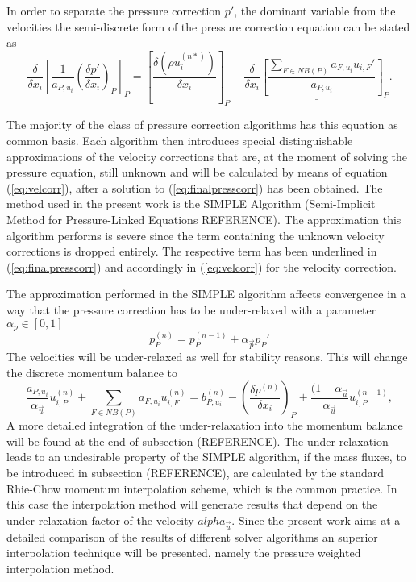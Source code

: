   In order to separate the pressure correction \(p'\), the dominant variable from the velocities the semi-discrete form of the pressure correction equation can be stated as
  \begin{equation}
    \label{eq:finalpresscorr}
   \frac{\delta}{\delta x_i} \left[\frac{1}{a_{P,u_i}}\left(\frac{\delta p'}{\delta x_i}\right)_P\right]_{P}
  =
    \left[\frac{\delta \left(\rho u_i^{(n*)}\right)}{\delta x_i} \right]_{P}
    - \underline{\frac{\delta}{\delta x_i} \left[ \frac{\sum_{F \in NB(P)} a_{F,u_i} u_{i,F}'}{a_{P,u_i}}\right]_{P}}.
  \end{equation}
  
  The majority of the class of pressure correction algorithms has this equation as common basis. Each algorithm then introduces special distinguishable approximations of the velocity corrections that are, at the moment of solving the pressure equation, still unknown and will be calculated by means of equation (\ref{eq:velcorr}), after a solution to (\ref{eq:finalpresscorr}) has been obtained. The method used in the present work is the SIMPLE Algorithm (Semi-Implicit Method for Pressure-Linked Equations REFERENCE). The approximation this algorithm performs is severe since the term containing the unknown velocity corrections is dropped entirely. The respective term has been underlined in (\ref{eq:finalpresscorr}) and accordingly in (\ref{eq:velcorr}) for the velocity correction.
  
  The approximation performed in the SIMPLE algorithm affects convergence in a way that the pressure correction has to be under-relaxed with a parameter \(\alpha_p \in [0,1]\)
  \begin{equation}
    p_P^{(n)} = p_P^{(n-1)} + \alpha_{\vec{p}} p_P'
  \end{equation}
  The velocities will be under-relaxed as well for stability reasons. This will change the discrete momentum balance to
  \begin{displaymath}
    \frac{a_{P,u_i}}{\alpha_{\vec{u}}} u_{i,P}^{(n)} + \sum_{F \in NB(P)} a_{F,u_i} u_{i,F}^{(n)} = b_{P,u_i}^{(n)} - \left(\frac{\delta p^{(n)}}{\delta x_i}\right)_P + \frac{(1 - \alpha_{\vec{u}}}{\alpha_{\vec{u}}} u_{i,P}^{(n-1)} ,
  \end{displaymath}
  A more detailed integration of the under-relaxation into the momentum balance will be found at the end of subsection (REFERENCE). The under-relaxation leads to an undesirable property of the SIMPLE algorithm, if the mass fluxes, to be introduced in subsection (REFERENCE), are calculated by the standard Rhie-Chow momentum interpolation scheme, which is the common practice. In this case the interpolation method will generate results that depend on the under-relaxation factor of the velocity \(alpha_{\vec{u}}\). Since the present work aims at a detailed comparison of the results of different solver algorithms an superior interpolation technique will be presented, namely the pressure weighted interpolation method.

